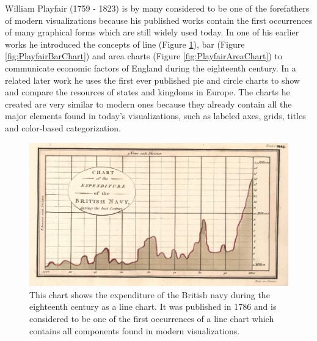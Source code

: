 William Playfair (1759 - 1823) is by many considered to be one of the forefathers of modern visualizations because his published works contain the first occurrences of many graphical forms which are still widely used today. In one of his earlier works \parencite{CommercialAndPoliticalAtlas} he introduced the concepts of line (Figure \ref{fig:PlayfairLineChart}), bar (Figure \ref{fig:PlayfairBarChart}) and area charts (Figure \ref{fig:PlayfairAreaChart}) to communicate economic factors of England during the eighteenth century. In a related later work \parencite{StatisticalBreviary} he uses the first ever published pie and circle charts to show and compare the resources of states and kingdoms in Europe. The charts he created are very similar to modern ones because they already contain all the major elements found in today's visualizations, such as labeled axes, grids, titles and color-based categorization.

\begin{figure}[tp]
    \centering
    \includegraphics[keepaspectratio,width=\linewidth,height=\fullh / 3]
    {images/playfair-line-chart.png}
    \caption[Line Chart by William Playfair From 1786]{
        This chart shows the expenditure of the British navy during the eighteenth century as a line chart. It was published in 1786 and is considered to be one of the first occurrences of a line chart which contains all components found in modern visualizations. 
    }
    \label{fig:PlayfairLineChart}
\end{figure}

